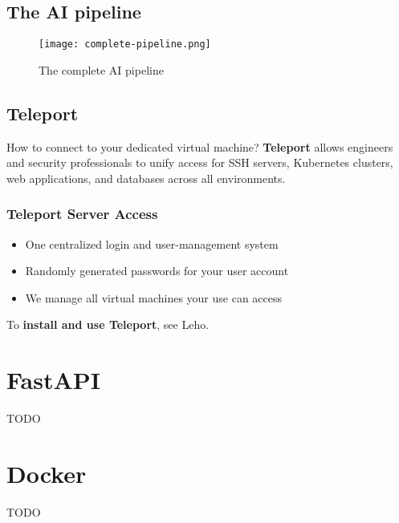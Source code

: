 \documentclass{article}
\begin{document}
\subsection{The AI pipeline}

\begin{figure}[H]
    \centering
    \texttt{[image: complete-pipeline.png]}
    \caption{The complete AI pipeline}
\end{figure}

\subsection{Teleport}

How to connect to your dedicated virtual machine? 
\textbf{Teleport} allows engineers and security professionals 
to unify access for SSH servers, Kubernetes clusters, 
web applications, and databases across all environments.

\subsubsection{Teleport Server Access}

\begin{itemize}
    \item One centralized login and user-management system
    \item Randomly generated passwords for your user account
    \item We manage all virtual machines your use can access
\end{itemize}

To \textbf{install and use Teleport}, see Leho.

\section{FastAPI}

TODO

\section{Docker}

TODO
\end{document}
